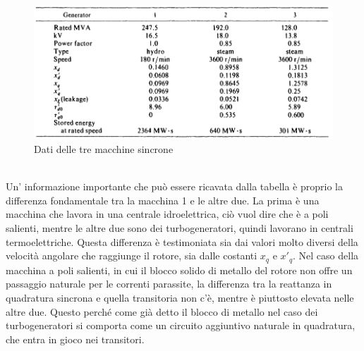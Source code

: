 \documentclass[Lau,noexaminfo]{sapthesis}
\begin{document}
	\begin{figure}
		\includegraphics[height=0.3\textheight]{macchineWSCC}
		\caption{Dati delle tre macchine sincrone}
	\end{figure}\\
	Un' informazione importante che può essere ricavata dalla tabella è proprio la differenza fondamentale tra la macchina 1 e le altre due. La prima è una macchina che lavora in una centrale idroelettrica, ciò vuol dire che è a poli salienti, mentre le altre due sono dei turbogeneratori, quindi lavorano in centrali termoelettriche. Questa differenza è testimoniata sia dai valori molto diversi della velocità angolare che raggiunge il rotore, sia dalle costanti $x_q$ e $x'_q$. Nel caso della macchina a poli salienti, in cui il blocco solido di metallo del rotore non offre un passaggio naturale per le correnti parassite, la differenza tra la reattanza in quadratura sincrona e quella transitoria non c'è, mentre è piuttosto elevata nelle altre due. Questo perché come già detto il blocco di metallo nel caso dei turbogeneratori si comporta come un circuito aggiuntivo naturale in quadratura, che entra in gioco nei transitori.
\end{document}

